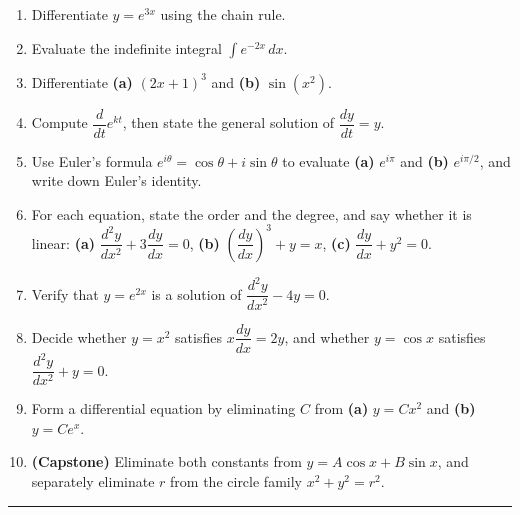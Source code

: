 \documentclass[11pt]{article}
\begin{document}
\begin{enumerate}[leftmargin=2em]
    \item Differentiate $y = e^{3x}$ using the chain rule.

    \item Evaluate the indefinite integral $\displaystyle\int e^{-2x}\,dx$.

    \item Differentiate \textbf{(a)} $(2x+1)^{3}$ and \textbf{(b)} $\sin(x^{2})$.

    \item Compute $\dfrac{d}{dt}e^{kt}$, then state the general solution of
          $\dfrac{dy}{dt} = y$.

    \item Use Euler's formula $e^{i\theta} = \cos\theta + i\sin\theta$ to
          evaluate \textbf{(a)} $e^{i\pi}$ and \textbf{(b)} $e^{i\pi/2}$, and
          write down Euler's identity.

    \item For each equation, state the order and the degree, and say whether it
          is linear:
          \textbf{(a)} $\dfrac{d^{2}y}{dx^{2}} + 3\dfrac{dy}{dx} = 0$, \quad
          \textbf{(b)} $\left(\dfrac{dy}{dx}\right)^{3} + y = x$, \quad
          \textbf{(c)} $\dfrac{dy}{dx} + y^{2} = 0$.

    \item Verify that $y = e^{2x}$ is a solution of $\dfrac{d^{2}y}{dx^{2}} - 4y = 0$.

    \item Decide whether $y = x^{2}$ satisfies $x\dfrac{dy}{dx} = 2y$, and
          whether $y = \cos x$ satisfies $\dfrac{d^{2}y}{dx^{2}} + y = 0$.

    \item Form a differential equation by eliminating $C$ from \textbf{(a)}
          $y = Cx^{2}$ and \textbf{(b)} $y = Ce^{x}$.

    \item \textbf{(Capstone)} Eliminate both constants from
          $y = A\cos x + B\sin x$, and separately eliminate $r$ from the circle
          family $x^{2} + y^{2} = r^{2}$.
\end{enumerate}

\vspace{0.4em}
\hrule
\vspace{0.6em}

\clearpage
\end{document}
